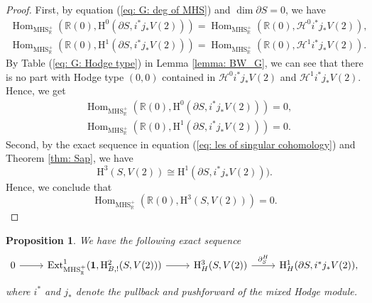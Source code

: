 \documentclass[11pt, a4paper]{amsart}
\theoremstyle{plain}
\newtheorem{proposition}[theorem]{Proposition}
\theoremstyle{definition}
\numberwithin{equation}{section}
\def\RR{\mathbb{R}}
\DeclareMathOperator{\Hom}{Hom}
\DeclareMathOperator{\Ext}{Ext}
\begin{document}
\begin{proof}
    \par First, by equation (\ref{eq: G: deg of MHS}) and $\dim \partial S = 0$, we have 
        \begin{align*}
            \Hom_{\mathrm{MHS_{\RR}^{+}}}(\RR(0), \mathrm{H}^{0}(\partial S,i^{*}j_{*}V(2))) = \Hom_{\mathrm{MHS_{\RR}^{+}}}(\RR(0), \mathcal{H}^{0}i^{*}j_{*}V(2)), \\
            \Hom_{\mathrm{MHS_{\RR}^{+}}}(\RR(0), \mathrm{H}^{1}(\partial S,i^{*}j_{*}V(2))) = \Hom_{\mathrm{MHS_{\RR}^{+}}}(\RR(0), \mathcal{H}^{1}i^{*}j_{*}V(2)).
        \end{align*}
        By Table (\ref{eq: G: Hodge type}) in Lemma \ref{lemma: BW_G}, we can see that there is no part with Hodge type $(0, 0)$ contained in $\mathcal{H}^{0}i^{*}j_{*}V(2)$ and $\mathcal{H}^{1}i^{*}j_{*}V(2)$. Hence, we get
        \begin{align*}
             & \Hom_{\mathrm{MHS_{\RR}^{+}}}(\RR(0), \mathrm{H}^{0}(\partial S,i^{*}j_{*}V(2))) = 0, \\
        & \Hom_{\mathrm{MHS_{\RR}^{+}}}(\RR(0), \mathrm{H}^{1}(\partial S,i^{*}j_{*}V(2))) = 0. 
        \end{align*}
        Second, by the exact sequence in equation (\ref{eq: les of singular cohomology}) and Theorem \ref{thm: Sap}, we have 
        \begin{equation*}
            \mathrm{H}^{3}(S,V(2)) \cong \mathrm{H}^{1}(\partial S,i^{*}j_{*}V(2))). 
        \end{equation*}
        Hence, we conclude that 
        \[
            \Hom_{\mathrm{MHS_{\RR}^{+}}}(\RR(0), \mathrm{H}^{3}(S,V(2))) = 0.    
        \]
\end{proof}

\begin{proposition}
\label{Prop: Hodge exact sequence}
We have the following exact sequence
\[
    \begin{tikzcd}
        0 \ar[r] & \Ext^{1}_{\mathrm{MHS}_{\RR}^{+}}(\mathbf{1}, \mathrm{H}^{2}_{B,!}(S, V(2))) \ar[r] &  \mathrm{H}^{3}_{H}(S,V(2)) \ar[r, "{\partial_{S}^{H}}"] & \mathrm{H}^{1}_{H}(\partial{S}, i^{*}j_{*}V(2)),
    \end{tikzcd} 
\]
where $i^{*}$ and $j_{*}$ denote the pullback and pushforward of the mixed Hodge module. 

\end{proposition}
\end{document}
